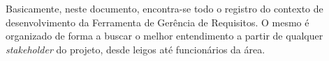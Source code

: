 Basicamente, neste documento, encontra-se todo o registro do contexto de desenvolvimento da Ferramenta de Gerência de Requisitos. O mesmo é organizado de forma a buscar o melhor entendimento a partir de qualquer \textit{stakeholder} do projeto, desde leigos até funcionários da área.








